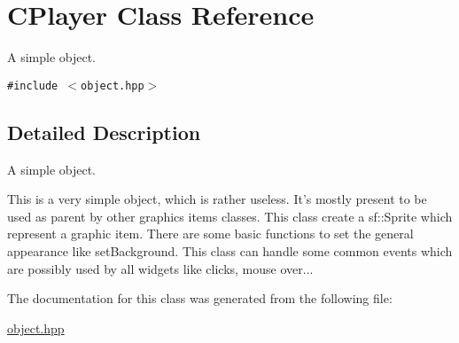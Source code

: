 \hypertarget{classCPlayer}{
\section{CPlayer Class Reference}
\label{classCPlayer}
}
A simple object.  


{\tt \#include $<$object.hpp$>$}



\subsection{Detailed Description}
A simple object. 

This is a very simple object, which is rather useless. It's mostly present to be used as parent by other graphics items classes. This class create a sf::Sprite which represent a graphic item. There are some basic functions to set the general appearance like setBackground. This class can handle some common events which are possibly used by all widgets like clicks, mouse over... 

The documentation for this class was generated from the following file:\begin{CompactItemize}
\item 
\hyperlink{object_8hpp}{object.hpp}\end{CompactItemize}
